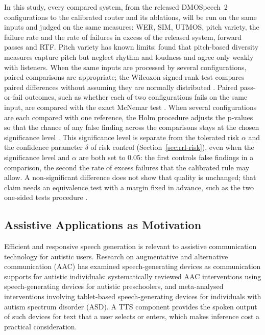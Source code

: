 In this study, every compared system, from the released DMOSpeech~2 configurations to the calibrated router and its ablations, will be run on the same inputs and judged on the same measures: WER, SIM, UTMOS, pitch variety, the failure rate and the rate of failures in excess of the released system, forward passes and RTF. Pitch variety has known limits: \textcite{yang2025prosody} found that pitch-based diversity measures capture pitch but neglect rhythm and loudness and agree only weakly with listeners. When the same inputs are processed by several configurations, paired comparisons are appropriate; the Wilcoxon signed-rank test compares paired differences without assuming they are normally distributed \parencite{wilcoxon1945}. Paired pass-or-fail outcomes, such as whether each of two configurations fails on the same input, are compared with the exact McNemar test \parencite{mcnemar1947}. When several configurations are each compared with one reference, the Holm procedure adjusts the p-values so that the chance of any false finding across the comparisons stays at the chosen significance level \parencite{holm1979}. This significance level is separate from the tolerated risk $\alpha$ and the confidence parameter $\delta$ of risk control (Section~\ref{sec:rrl-risk}), even when the significance level and $\alpha$ are both set to 0.05: the first controls false findings in a comparison, the second the rate of excess failures that the calibrated rule may allow. A non-significant difference does not show that quality is unchanged; that claim needs an equivalence test with a margin fixed in advance, such as the two one-sided tests procedure \parencite{schuirmann1987}.

\subsection{Assistive Applications as Motivation}
\label{sec:rrl-assistive}

Efficient and responsive speech generation is relevant to assistive communication technology for autistic users. Research on augmentative and alternative communication (AAC) has examined speech-generating devices as communication supports for autistic individuals: \textcite{therrien2025sgd} systematically reviewed AAC interventions using speech-generating devices for autistic preschoolers, and \textcite{muharib2024sgd} meta-analysed interventions involving tablet-based speech-generating devices for individuals with autism spectrum disorder (ASD). A TTS component provides the spoken output of such devices for text that a user selects or enters, which makes inference cost a practical consideration.

